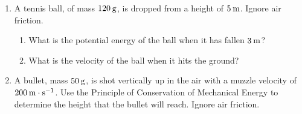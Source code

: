             \label{m38786*id70623}\begin{enumerate}[noitemsep, label=\textbf{\arabic*}. ] 
            \label{m38786*uid95}\item A tennis ball, of mass \begin{math}120\phantom{\rule{2pt}{0ex}}\mathrm{g}\end{math}, is dropped from a height of \begin{math}5\phantom{\rule{2pt}{0ex}}\mathrm{m}\end{math}. Ignore air friction.
\label{m38786*id70639}\begin{enumerate}[noitemsep, label=\textbf{\alph*}. ] 
            \label{m38786*uid96}\item What is the potential energy of the ball when it has fallen \begin{math}3\phantom{\rule{2pt}{0ex}}\mathrm{m}\end{math}?
\label{m38786*uid97}\item What is the velocity of the ball when it hits the ground?
\end{enumerate}
                \label{m38786*uid98}\item A bullet, mass \begin{math}50\phantom{\rule{2pt}{0ex}}\mathrm{g}\end{math}, is shot vertically up in the air with a muzzle velocity of \begin{math}200\phantom{\rule{2pt}{0ex}}\mathrm{m}\ensuremath{\cdot}\mathrm{s}{}^{-1}\end{math}. Use the Principle of Conservation of Mechanical Energy to determine the height that the bullet will reach. Ignore air friction.\newline
            

\end{enumerate}
